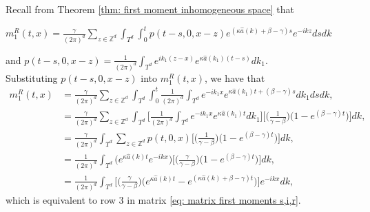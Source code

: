 \documentclass[sn-basic]{sn-jnl}%
\theoremstyle{thmstyleone}%
\theoremstyle{thmstyletwo}%
\theoremstyle{thmstylethree}%
\numberwithin{equation}{theorem}
\begin{document}
Recall from Theorem \ref{thm: first moment inhomogeneous space} that\\
\begin{center}
$m_{1}^{R}(t,x) = \displaystyle \frac{\gamma}{(2\pi)^d} \sum\limits_{z \in \mathbb{Z}^d} \int_{T^{d}} \int_{0}^{t} p(t-s,0,x-z) e^{\displaystyle (\kappa\hat{a}(k)+\beta-\gamma)s} e^{\displaystyle -ikz}ds dk$ 
\end{center}
and $p(t-s,0,x-z) = \displaystyle \frac{1}{(2\pi)^d} \int_{T^{d}} e^{\displaystyle ik_{1}(z-x)} e^{\displaystyle \kappa\hat{a}(k_{1})(t-s)}dk_{1}$.\\
Substituting $p(t-s,0,x-z)$ into $m_{1}^{R}(t,x)$, we have that
\begin{align*}
m_{1}^{R}(t,x) &= \displaystyle \frac{\gamma}{(2\pi)^d} \sum\limits_{z \in \mathbb{Z}^d} \int_{T^{d}} \int_{0}^{t} \displaystyle \frac{1}{(2\pi)^d} \int_{T^{d}} e^{\displaystyle -ik_{1}x} e^{\displaystyle \kappa\hat{a}(k_{1})t+(\beta-\gamma)s} dk_{1} ds dk,\\
&= \displaystyle \frac{\gamma}{(2\pi)^d} \sum\limits_{z \in \mathbb{Z}^d} \int_{T^{d}} \Big[\displaystyle \frac{1}{(2\pi)^d} \int_{T^{d}} e^{\displaystyle -ik_{1}x} e^{\displaystyle \kappa\hat{a}(k_{1})t}dk_{1}\Big] \Big[\Big(\displaystyle \frac{1}{\gamma- \beta}\Big) \Big(1-e^{\displaystyle (\beta-\gamma)t}\Big)\Big]dk,\\
&=\displaystyle \frac{\gamma}{(2\pi)^d} \int_{T^{d}} \sum\limits_{z \in \mathbb{Z}^d} p(t,0,x) \Big[\Big(\displaystyle \frac{1}{\gamma- \beta}\Big) \Big(1-e^{\displaystyle (\beta-\gamma)t}\Big)\Big]dk,\\
&=\displaystyle \frac{1}{(2\pi)^d} \int_{T^{d}} \Big(e^{\displaystyle \kappa\hat{a}(k)t} e^{\displaystyle -ikx} \Big)\Big[\Big(\displaystyle \frac{\gamma}{\gamma- \beta}\Big) \Big(1-e^{\displaystyle (\beta-\gamma)t}\Big)\Big]dk,\\
&=\displaystyle \frac{1}{(2\pi)^d} \int_{T^{d}} \Big[\Big(\displaystyle \frac{\gamma}{\gamma- \beta}\Big) \Big(e^{\displaystyle \kappa\hat{a}(k)t}-e^{\displaystyle (\kappa\hat{a}(k) + \beta-\gamma)t}\Big)\Big]e^{\displaystyle -ikx} dk,
\end{align*} which is equivalent to row $3$ in matrix \eqref{eq: matrix first moments s,i,r}. 
\end{document}
